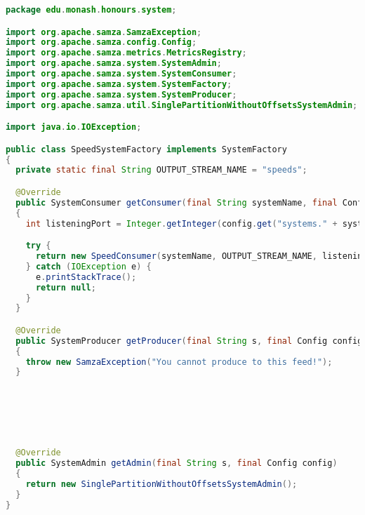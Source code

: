 \clearpage


\begin{lstlisting}[language=java,caption=edu.monash.honours.system.SpeedSystemFactory (Java)]
package edu.monash.honours.system;

import org.apache.samza.SamzaException;
import org.apache.samza.config.Config;
import org.apache.samza.metrics.MetricsRegistry;
import org.apache.samza.system.SystemAdmin;
import org.apache.samza.system.SystemConsumer;
import org.apache.samza.system.SystemFactory;
import org.apache.samza.system.SystemProducer;
import org.apache.samza.util.SinglePartitionWithoutOffsetsSystemAdmin;

import java.io.IOException;

public class SpeedSystemFactory implements SystemFactory
{
  private static final String OUTPUT_STREAM_NAME = "speeds";

  @Override
  public SystemConsumer getConsumer(final String systemName, final Config config, final MetricsRegistry metricsRegistry)
  {
    int listeningPort = Integer.getInteger(config.get("systems." + systemName + ".listeningPort"));

    try {
      return new SpeedConsumer(systemName, OUTPUT_STREAM_NAME, listeningPort);
    } catch (IOException e) {
      e.printStackTrace();
      return null;
    }
  }

  @Override
  public SystemProducer getProducer(final String s, final Config config, final MetricsRegistry metricsRegistry)
  {
    throw new SamzaException("You cannot produce to this feed!");
  }






  @Override
  public SystemAdmin getAdmin(final String s, final Config config)
  {
    return new SinglePartitionWithoutOffsetsSystemAdmin();
  }
}
\end{lstlisting}

